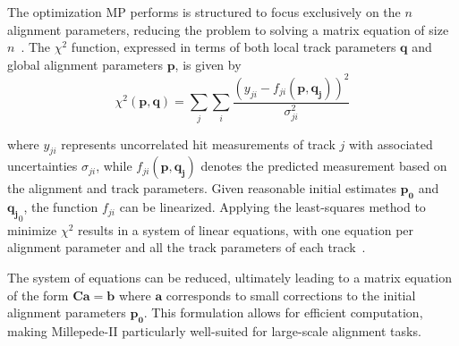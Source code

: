The optimization MP performs is structured to focus exclusively on the $n$ alignment parameters, reducing the problem to solving a matrix equation of size $n$~\cite{WAdam_2009}. The $\chi^2$ function, expressed in terms of both local track parameters $\mathbf{q}$ and global alignment parameters $\mathbf{p}$, is given by  
\begin{equation}
\chi^2(\mathbf{p},\mathbf{q}) = \sum_{j} \sum_{i} \frac{\left(y_{ji} - f_{ji}(\mathbf{p}, \mathbf{q_j})\right)^2}{\sigma^2_{ji}}
\end{equation}

where $y_{ji}$ represents uncorrelated hit measurements of track $j$ with associated uncertainties $\sigma_{ji}$, while $f_{ji}(\mathbf{p}, \mathbf{q_j})$ denotes the predicted measurement based on the alignment and track parameters. Given reasonable initial estimates $\mathbf{p_0}$ and $\mathbf{q_j}_0$, the function $f_{ji}$ can be linearized. Applying the least-squares method to minimize $\chi^2$ results in a system of linear equations, with one equation per alignment parameter and all the track parameters of each track~\cite{WAdam_2009}.

The system of equations can be reduced, ultimately leading to a matrix equation of the form $\mathbf{C} \mathbf{a} = \mathbf{b}$ where $\mathbf{a}$ corresponds to small corrections to the initial alignment parameters $\mathbf{p_0}$. This formulation allows for efficient computation, making Millepede-II particularly well-suited for large-scale alignment tasks.






